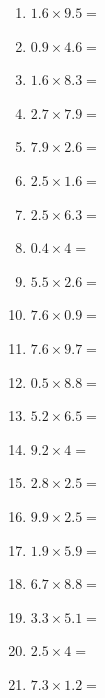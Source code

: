 \documentclass[12pt]{article}
\begin{document}
\begin{enumerate}
\item \large $ 1.6 \times 9.5 = $ \vspace{1.5cm}
\newpage
\item \large $ 0.9 \times 4.6 = $ \vspace{1.5cm}
\item \large $ 1.6 \times 8.3 = $ \vspace{1.5cm}
\item \large $ 2.7 \times 7.9 = $ \vspace{1.5cm}
\item \large $ 7.9 \times 2.6 = $ \vspace{1.5cm}
\item \large $ 2.5 \times 1.6 = $ \vspace{1.5cm}
\item \large $ 2.5 \times 6.3 = $ \vspace{1.5cm}
\item \large $ 0.4 \times 4 = $ \vspace{1.5cm}
\item \large $ 5.5 \times 2.6 = $ \vspace{1.5cm}
\item \large $ 7.6 \times 0.9 = $ \vspace{1.5cm}
\item \large $ 7.6 \times 9.7 = $ \vspace{1.5cm}
\newpage
\item \large $ 0.5 \times 8.8 = $ \vspace{1.5cm}
\item \large $ 5.2 \times 6.5 = $ \vspace{1.5cm}
\item \large $ 9.2 \times 4 = $ \vspace{1.5cm}
\item \large $ 2.8 \times 2.5 = $ \vspace{1.5cm}
\item \large $ 9.9 \times 2.5 = $ \vspace{1.5cm}
\item \large $ 1.9 \times 5.9 = $ \vspace{1.5cm}
\item \large $ 6.7 \times 8.8 = $ \vspace{1.5cm}
\item \large $ 3.3 \times 5.1 = $ \vspace{1.5cm}
\item \large $ 2.5 \times 4 = $ \vspace{1.5cm}
\item \large $ 7.3 \times 1.2 = $ \vspace{1.5cm}

\end{enumerate}
\end{document}
